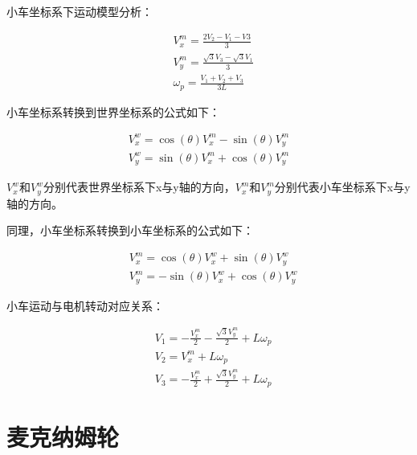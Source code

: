 小车坐标系下运动模型分析：

\begin{equation}
    \begin{aligned}
    &V_{x}^{m}=\frac{2 V_{2}-V_{1}-V 3}{3}\\
    &V_{y}^{m}=\frac{\sqrt{3} V_{3}-\sqrt{3} V_{1}}{3}\\
    &\omega_{p}=\frac{V_{1}+V_{2}+V_{3}}{3 L}
    \end{aligned}
\end{equation}

小车坐标系转换到世界坐标系的公式如下：

\begin{equation}
    \begin{array}{l}
    {V_{x}^{w}=\cos (\theta) V_{x}^{m}-\sin (\theta) V_{y}^{m}} \\
    {V_{y}^{w}=\sin (\theta) V_{x}^{m}+\cos (\theta) V_{y}^{m}}
    \end{array}
\end{equation}

$V_{x}^{w}$和$V_{y}^{w}$分别代表世界坐标系下x与y轴的方向，$V_{x}^{m}$和$V_{y}^{m}$分别代表小车坐标系下x与y轴的方向。

同理，小车坐标系转换到小车坐标系的公式如下：

\begin{equation}
    \begin{aligned}
    &V_{x}^{m}=\cos (\theta) V_{x}^{w}+\sin (\theta) V_{y}^{w}\\
    &V_{y}^{m}=-\sin (\theta) V_{x}^{w}+\cos (\theta) V_{y}^{w}
    \end{aligned}
\end{equation}

小车运动与电机转动对应关系：

\begin{equation}
    \begin{aligned}
    &V_{1}=-\frac{V_{x}^{m}}{2}-\frac{\sqrt{3} V_{y}^{m}}{2}+L \omega_{p}\\
    &V_{2}=V_{x}^{m}+L \omega_{p}\\
    &V_{3}=-\frac{V_{x}^{m}}{2}+\frac{\sqrt{3} V_{y}^{m}}{2}+L \omega_{p}
    \end{aligned}
\end{equation}

\section{麦克纳姆轮}

